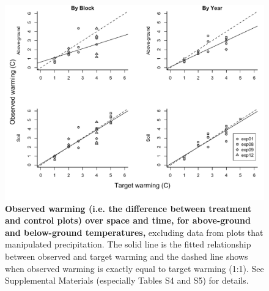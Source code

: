 \documentclass{article}
\begin{document}
 \begin{figure}[p]
   \centering
 \includegraphics{../Analyses/figures/blockyearvar.pdf}  
 \caption{\textbf{Observed warming (i.e. the difference between treatment and control plots) over space and time, for above-ground and below-ground temperatures,} excluding data from plots that manipulated precipitation. The solid line is the fitted relationship between observed and target warming and the dashed line shows when observed warming is exactly equal to target warming (1:1). See Supplemental Materials (especially Tables S4 and S5) for details.}
 \label{fig:blockyear}
 \end{figure}
 \clearpage
 
\end{document}
